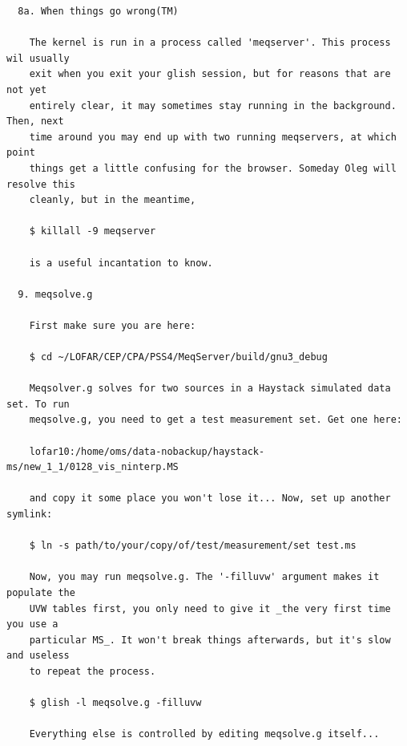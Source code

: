 \documentclass[10pt]{article}
\begin{document}
\begin{verbatim}
  8a. When things go wrong(TM)

    The kernel is run in a process called 'meqserver'. This process wil usually
    exit when you exit your glish session, but for reasons that are not yet 
    entirely clear, it may sometimes stay running in the background. Then, next
    time around you may end up with two running meqservers, at which point
    things get a little confusing for the browser. Someday Oleg will resolve this
    cleanly, but in the meantime,

    $ killall -9 meqserver

    is a useful incantation to know.

  9. meqsolve.g

    First make sure you are here:

    $ cd ~/LOFAR/CEP/CPA/PSS4/MeqServer/build/gnu3_debug

    Meqsolver.g solves for two sources in a Haystack simulated data set. To run
    meqsolve.g, you need to get a test measurement set. Get one here:

    lofar10:/home/oms/data-nobackup/haystack-ms/new_1_1/0128_vis_ninterp.MS

    and copy it some place you won't lose it... Now, set up another symlink:

    $ ln -s path/to/your/copy/of/test/measurement/set test.ms

    Now, you may run meqsolve.g. The '-filluvw' argument makes it populate the
    UVW tables first, you only need to give it _the very first time you use a
    particular MS_. It won't break things afterwards, but it's slow and useless
    to repeat the process.

    $ glish -l meqsolve.g -filluvw

    Everything else is controlled by editing meqsolve.g itself...
\end{verbatim}
    
  
\end{document}
